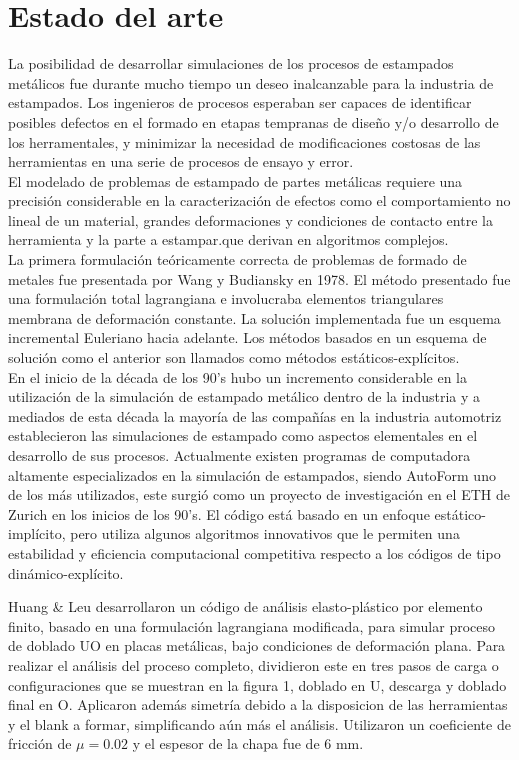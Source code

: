 \section{Estado del arte}

La posibilidad de desarrollar simulaciones de los procesos de estampados metálicos fue durante mucho tiempo 
un deseo inalcanzable para la industria de estampados. Los ingenieros de procesos esperaban ser capaces de 
identificar posibles defectos en el formado en etapas tempranas de diseño y/o desarrollo de los herramentales, 
y minimizar la necesidad de modificaciones costosas de las herramientas en una serie de procesos de ensayo y error. \\

El modelado de problemas de estampado de partes metálicas requiere una precisión considerable en la caracterización 
de efectos como el comportamiento no lineal de un material, grandes deformaciones y condiciones de contacto entre la
herramienta y la parte a estampar.que derivan  en algoritmos complejos.\cite{banabic2000}\\

La primera formulación teóricamente correcta de problemas de formado de metales fue presentada por Wang y Budiansky 
\cite{wang1978} en 1978. El método presentado fue una formulación total lagrangiana e involucraba elementos triangulares membrana de 
deformación constante. La solución implementada fue un esquema incremental Euleriano hacia adelante. Los métodos basados en un 
esquema de solución como el anterior son llamados como métodos estáticos-explícitos.\\

En el inicio de la década de los 90's hubo un incremento considerable en la utilización de la simulación de estampado 
metálico dentro de la industria y a mediados de esta década la mayoría de las compañías en la industria automotriz 
establecieron las simulaciones de estampado como aspectos elementales en el desarrollo de sus procesos. 
Actualmente existen programas de computadora altamente especializados en la simulación de estampados, siendo AutoForm 
uno de los más utilizados, este surgió como un proyecto de investigación en el ETH de Zurich en los inicios de los 90's. 
El código está basado en un enfoque estático-implícito, pero utiliza algunos algoritmos innovativos que le permiten 
una estabilidad y eficiencia computacional competitiva respecto a los códigos de tipo dinámico-explícito.\cite{banabic2000}

Huang & Leu \cite{huang1995} desarrollaron un código de análisis elasto-plástico por elemento finito, basado en una formulación 
lagrangiana modificada, para simular proceso de doblado UO en placas metálicas, bajo condiciones de deformación 
plana. Para realizar el análisis del proceso completo, dividieron este en tres pasos de carga o configuraciones 
que se muestran en la figura 1, doblado en U, descarga y doblado final en O. Aplicaron además simetría debido a la 
disposicion de las herramientas y el blank a formar, simplificando aún más el análisis. Utilizaron un coeficiente 
de fricción de $\mu = 0.02$ y el espesor de la chapa fue de 6 mm.\\

